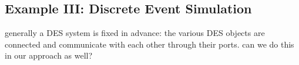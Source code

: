 \subsection{Example III: Discrete Event Simulation}
generally a DES system is fixed in advance: the various DES objects are connected and communicate with each other through their ports. can we do this in our approach as well?